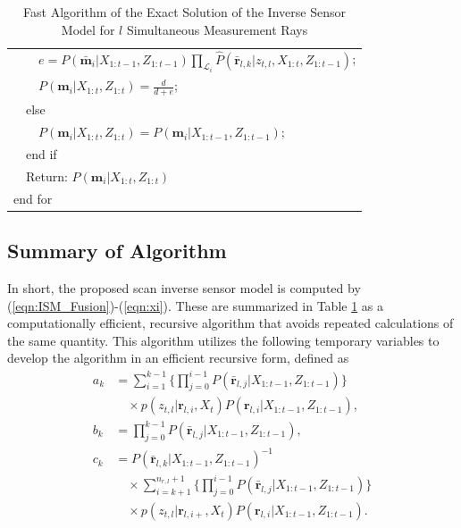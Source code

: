 \documentclass[letterpaper, 10pt, conference]{ieeeconf}
\newcommand{\refeqn}[1]{(\ref{eqn:#1})}
\begin{document}
\begin{table}
\begin{tabular}{ l }
   \ \ \ \ $e=P(\bar{\mathbf{m}}_i|X_{1:t-1},Z_{1:t-1})\prod_{\mathcal L_i}\hat P(\bar{\mathbf{r}}_{l,k}|z_{t,l},X_{1:t},Z_{1:t-1})$;\\
   \ \ \ \ $P(\mathbf{m}_i|X_{1:t},Z_{1:t})=\frac{d}{d+e}$;\\
   \ \ else\\
   \ \ \ \ $P(\mathbf{m}_i|X_{1:t},Z_{1:t})=P(\mathbf{m}_i|X_{1:t-1},Z_{1:t-1});$\\
   \ \ end if\\
   \ \ Return: $P(\mathbf{m}_i|X_{1:t},Z_{1:t})$\\
   end for\\

\end{tabular}
\caption{Fast Algorithm of the Exact Solution of the Inverse Sensor Model for $l$ Simultaneous Measurement Rays}
\label{tab:Alg_ISM_2D}
\end{table}

\subsection{Summary of Algorithm}

In short, the proposed scan inverse sensor model is computed by \refeqn{ISM_Fusion}-\refeqn{xi}. These are summarized in Table \ref{tab:Alg_ISM_2D} as a computationally efficient, recursive algorithm that avoids repeated calculations of the same quantity. This algorithm utilizes the following temporary variables to develop the algorithm in an efficient recursive form, defined as
\begin{align*}
a_k&=\sum_{i=1}^{k-1}\bigg\{\prod_{j=0}^{i-1}P(\bar{\mathbf{r}}_{l,j}|X_{1:t-1},Z_{1:t-1})\bigg\}\nonumber\\&\quad\times p(z_{t,l}|\mathbf{r}_{l,i},X_t)P(\mathbf{r}_{l,i}|X_{1:t-1},Z_{1:t-1}),
\\
b_k&=\prod_{j=0}^{k-1}P(\bar{\mathbf{r}}_{l,j}|X_{1:t-1},Z_{1:t-1}),
\nonumber\\
c_k&=P(\bar{\mathbf{r}}_{l,k}|X_{1:t-1},Z_{1:t-1})^{-1}
\nonumber\\&\quad\times 
\sum_{i=k+1}^{n_{r,l}+1}\bigg\{\prod_{j=0}^{i-1}P(\bar{\mathbf{r}}_{l,j}|X_{1:t-1},Z_{1:t-1})\bigg\}\nonumber\\&\quad\times p(z_{t,l}|\mathbf{r}_{l,i+},X_t)P(\mathbf{r}_{l,i}|X_{1:t-1},Z_{1:t-1}).%
\end{align*}
\end{document}

